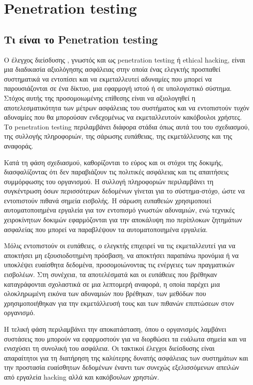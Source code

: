 \section{\lt Penetration testing}
\subsection{\gt Tι είναι το \lt Penetration testing}
{ 
\hspace*{2em}  Ο έλεγχος διείσδυσης , γνωστός και ως \lt penetration testing \gt ή \lt ethical hacking, \gt είναι μια διαδικασία αξιολόγησης ασφάλειας στην οποία ένας ελεγκτής προσπαθεί συστηματικά να εντοπίσει και να εκμεταλλευτεί αδυναμίες που μπορεί να παρουσιάζονται σε ένα δίκτυο, μια εφαρμογή ιστού ή σε υπολογιστικό σύστημα. Στόχος αυτής της προσομοιωμένης επίθεσης είναι να αξιολογηθεί η αποτελεσματικότητα των μέτρων ασφάλειας του συστήματος και να εντοπιστούν τυχόν αδυναμίες που θα μπορούσαν ενδεχομένως να εκμεταλλευτούν κακόβουλοι χρήστες. Το \lt penetration testing \gt περιλαμβάνει διάφορα στάδια όπως αυτά του του σχεδιασμού, της συλλογής πληροφοριών, της σάρωσης ευπάθειας, της εκμετάλλευσης και της αναφοράς.



\hspace*{1em} Κατά τη φάση σχεδιασμού, καθορίζονται το εύρος και οι στόχοι της δοκιμής, διασφαλίζοντας ότι δεν παραβιάζουν  τις πολιτικές ασφάλειας και τις απαιτήσεις συμμόρφωσης του οργανισμού. Η συλλογή πληροφοριών περιλαμβάνει τη συγκέντρωση όσων περισσότερων δεδομένων γίνεται για το σύστημα-στόχο, ώστε να εντοπιστούν πιθανά σημεία εισβολής. Η σάρωση ευπαθειών χρησιμοποιεί αυτοματοποιημένα εργαλεία για τον εντοπισμό γνωστών αδυναμιών, ενώ τεχνικές χειροκίνητων δοκιμών εφαρμόζονται για την αποκάλυψη πιο περίπλοκων ζητημάτων ασφαλείας που μπορεί να παραβλέψουν τα αυτοματοποιημένα εργαλεία.

\hspace*{1em}Μόλις εντοπιστούν οι ευπάθειες, ο ελεγκτής επιχειρεί να τις εκμεταλλευτεί για να αποκτήσει μη εξουσιοδοτημένη πρόσβαση, να αποκτήσει παραπάνω προνόμια ή να υποκλέψει ευαίσθητα δεδομένα, προσομοιώνοντας τις ενέργειες των πραγματικών εισβολέων. Στη συνέχεια, τα αποτελέσματά και οι ευπάθειες που βρέθηκαν καταγράφονται σχολαστικά σε μια λεπτομερή αναφορά, η οποία παρέχει μια ολοκληρωμένη εικόνα των αδυναμιών που βρέθηκαν, των μεθόδων που χρησιμοποιήθηκαν για την εκμετάλλευσή τους και των πιθανών επιπτώσεων στον οργανισμό.

\hspace*{1em}Η τελική φάση περιλαμβάνει την αποκατάσταση, όπου ο οργανισμός λαμβάνει συστάσεις που μπορούν να εφαρμοστούν για να διορθώσει τα ευάλωτα  σημεία και να ενισχύσει τη συνολική του ασφάλεια. Οι τακτικοί έλεγχοι διείσδυσης είναι απαραίτητοι για τη διατήρηση της καλύτερης δυνατής ασφάλειας των συστημάτων και την προστασία ευαίσθητων δεδομένων έναντι των συνεχώς εξελισσόμενων απειλών από εργαλεία \lt hacking \gt αλλά και κακόβουλων χρηστών.
} 
